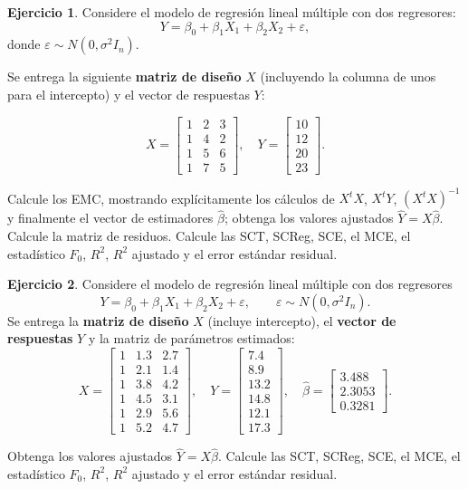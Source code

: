 \documentclass[
  11pt,
]{book}
\theoremstyle{definition}
\theoremstyle{definition}
\theoremstyle{definition}
\newtheorem{exercise}{Ejercicio}[chapter]
\theoremstyle{definition}
\theoremstyle{remark}
\begin{document}
\begin{exercise}
Considere el modelo de regresión lineal múltiple con dos regresores:
\[
Y = \beta_0 + \beta_1 X_1 + \beta_2 X_2 + \varepsilon,
\]
donde \(\varepsilon \sim N(0,\sigma^2I_n)\).

Se entrega la siguiente \textbf{matriz de diseño} \(X\) (incluyendo la columna de unos para el intercepto) y el vector de respuestas \(Y\):

\[
X =
\begin{bmatrix}
1 & 2 & 3 \\
1 & 4 & 2 \\
1 & 5 & 6 \\
1 & 7 & 5
\end{bmatrix},
\quad
Y =
\begin{bmatrix}
10 \\
12 \\
20 \\
23
\end{bmatrix}.
\]

Calcule los EMC, mostrando explícitamente los cálculos de \(X^tX\), \(X^tY\), \((X^tX)^{-1}\) y finalmente el vector de estimadores \(\hat\beta\); obtenga los valores ajustados \(\hat Y=X\hat\beta\). Calcule la matriz de residuos. Calcule las SCT, SCReg, SCE, el MCE, el estadístico \(F_0\), \(R^2\), \(R^2\) ajustado y el error estándar residual.
\end{exercise}

\begin{exercise}
Considere el modelo de regresión lineal múltiple con dos regresores
\[
Y=\beta_0+\beta_1X_1+\beta_2X_2+\varepsilon,\qquad \varepsilon\sim N(0,\sigma^2I_n).
\]
Se entrega la \textbf{matriz de diseño} \(X\) (incluye intercepto), el \textbf{vector de respuestas} \(Y\) y la matriz de parámetros estimados:
\[
X=
\begin{bmatrix}
1 & 1.3 & 2.7\\
1 & 2.1 & 1.4\\
1 & 3.8 & 4.2\\
1 & 4.5 & 3.1\\
1 & 2.9 & 5.6\\
1 & 5.2 & 4.7
\end{bmatrix},\quad
Y=
\begin{bmatrix}
7.4\\
8.9\\
13.2\\
14.8\\
12.1\\
17.3
\end{bmatrix},\quad
\widehat\beta=
\begin{bmatrix}
3.488\\
2.3053\\
0.3281
\end{bmatrix}.
\]

Obtenga los valores ajustados \(\hat Y=X\hat\beta\). Calcule las SCT, SCReg, SCE, el MCE, el estadístico \(F_0\), \(R^2\), \(R^2\) ajustado y el error estándar residual.
\end{exercise}
\end{document}
